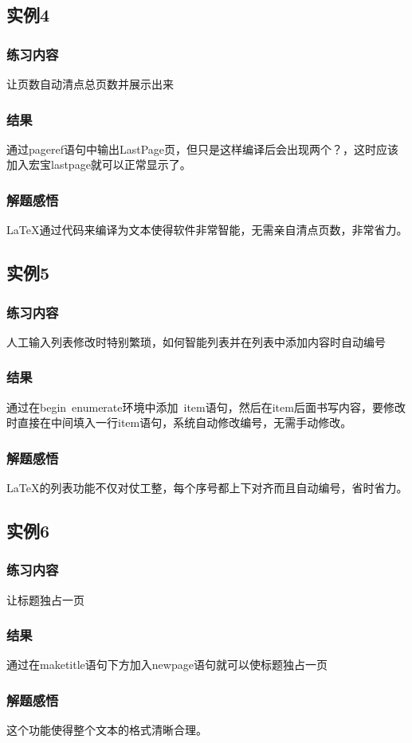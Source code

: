\documentclass{ctexart}
\begin{document}
\subsection{实例4}
\subsubsection{练习内容}
让页数自动清点总页数并展示出来
\subsubsection{结果}
通过pageref语句中输出LastPage页，但只是这样编译后会出现两个？，这时应该加入宏宝lastpage就可以正常显示了。
\subsubsection{解题感悟}
LaTeX通过代码来编译为文本使得软件非常智能，无需亲自清点页数，非常省力。
\subsection{实例5}
\subsubsection{练习内容}
人工输入列表修改时特别繁琐，如何智能列表并在列表中添加内容时自动编号
\subsubsection{结果}
通过在begin\ {enumerate}环境中添加\ item语句，然后在item后面书写内容，要修改时直接在中间填入一行item语句，系统自动修改编号，无需手动修改。
\subsubsection{解题感悟}
LaTeX的列表功能不仅对仗工整，每个序号都上下对齐而且自动编号，省时省力。
\subsection{实例6}
\subsubsection{练习内容}
让标题独占一页
\subsubsection{结果}
通过在maketitle语句下方加入newpage语句就可以使标题独占一页
\subsubsection{解题感悟}
这个功能使得整个文本的格式清晰合理。
\end{document}
